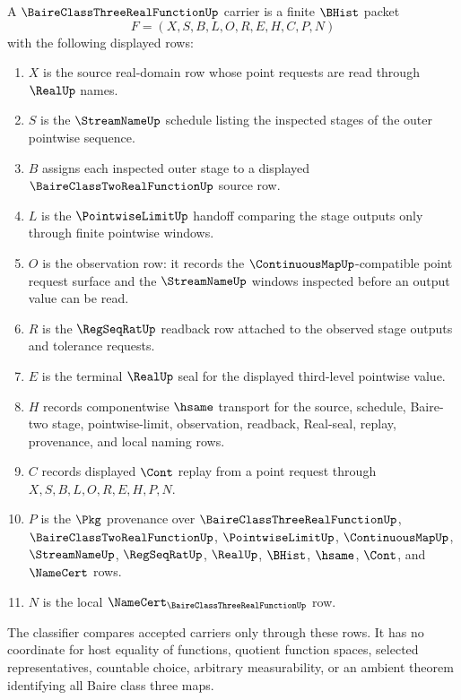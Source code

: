\begin{definition}
\label{def:baire-class-three-real-function-carrier}
A $\BaireClassThreeRealFunctionUp$ carrier is a finite $\BHist$ packet
$$
F=(X,S,B,L,O,R,E,H,C,P,N)
$$
with the following displayed rows:
\begin{enumerate}
\item $X$ is the source real-domain row whose point requests are read through $\RealUp$ names.
\item $S$ is the $\StreamNameUp$ schedule listing the inspected stages of the outer pointwise sequence.
\item $B$ assigns each inspected outer stage to a displayed $\BaireClassTwoRealFunctionUp$ source row.
\item $L$ is the $\PointwiseLimitUp$ handoff comparing the stage outputs only through finite pointwise windows.
\item $O$ is the observation row: it records the $\ContinuousMapUp$-compatible point request surface and the $\StreamNameUp$ windows inspected before an output value can be read.
\item $R$ is the $\RegSeqRatUp$ readback row attached to the observed stage outputs and tolerance requests.
\item $E$ is the terminal $\RealUp$ seal for the displayed third-level pointwise value.
\item $H$ records componentwise $\hsame$ transport for the source, schedule, Baire-two stage, pointwise-limit, observation, readback, Real-seal, replay, provenance, and local naming rows.
\item $C$ records displayed $\Cont$ replay from a point request through $X,S,B,L,O,R,E,H,P,N$.
\item $P$ is the $\Pkg$ provenance over $\BaireClassThreeRealFunctionUp$, $\BaireClassTwoRealFunctionUp$, $\PointwiseLimitUp$, $\ContinuousMapUp$, $\StreamNameUp$, $\RegSeqRatUp$, $\RealUp$, $\BHist$, $\hsame$, $\Cont$, and $\NameCert$ rows.
\item $N$ is the local $\NameCert_{\BaireClassThreeRealFunctionUp}$ row.
\end{enumerate}
The classifier compares accepted carriers only through these rows. It has no coordinate for host equality of functions, quotient function spaces, selected representatives, countable choice, arbitrary measurability, or an ambient theorem identifying all Baire class three maps.
\end{definition}

